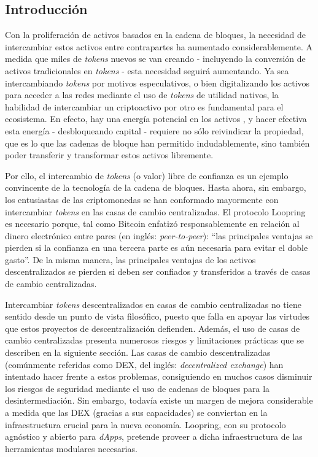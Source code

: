 \documentclass[UTF8,nofonts]{article}
\begin{document}
\begin{multicols}{2}
\section{Introducción\label{sec:introduction}}

Con la proliferación de activos basados en la cadena de bloques, la necesidad de intercambiar estos activos entre contrapartes ha aumentado considerablemente. A medida que miles de \textit{tokens} nuevos se van creando - incluyendo la conversión de activos tradicionales en \textit{tokens} - esta necesidad seguirá aumentando. Ya sea intercambiando \textit{tokens} por motivos especulativos, o bien digitalizando los activos para acceder a las redes mediante el uso de \textit{tokens} de utilidad nativos, la habilidad de intercambiar un criptoactivo por otro es fundamental para el ecosistema. En efecto, hay una energía potencial en los activos \cite{desotocapital}, y hacer efectiva esta energía - desbloqueando capital - requiere no sólo reivindicar la propiedad, que es lo que las cadenas de bloque han permitido indudablemente, sino también poder transferir y transformar estos activos libremente.
 
Por ello, el intercambio de \textit{tokens} (o valor) libre de confianza es un ejemplo convincente de la tecnología de la cadena de bloques. Hasta ahora, sin embargo, los entusiastas de las criptomonedas se han conformado mayormente con intercambiar \textit{tokens} en las casas de cambio centralizadas. El protocolo Loopring es necesario porque, tal como Bitcoin enfatizó responsablemente \cite{nakamoto2008bitcoin} en relación al dinero electrónico entre pares (en inglés: \textit{peer-to-peer}): \enquote{las principales ventajas se pierden si la confianza en una tercera parte es aún necesaria para evitar el doble gasto}. De la misma manera, las principales ventajas de los activos descentralizados se pierden si deben ser confiados y transferidos a través de casas de cambio centralizadas.

{\setlength{\parskip}{0cm}Intercambiar \textit{tokens} descentralizados en casas de cambio centralizadas no tiene sentido desde un punto de vista filosófico, puesto que falla en apoyar las virtudes que estos proyectos de descentralización defienden. Además, el uso de casas de cambio centralizadas presenta numerosos riesgos y limitaciones prácticas que se describen en la siguiente sección. Las casas de cambio descentralizadas (comúnmente referidas como DEX, del inglés: \textit{decentralized exchange}) \cite{schuh2015bitshares} \cite{bancor} \cite{kyber} han intentado hacer frente a estos problemas, consiguiendo en muchos casos disminuir los riesgos de seguridad mediante el uso de cadenas de bloques para la desintermediación. Sin embargo, todavía existe un margen de mejora considerable a medida que las DEX (gracias a sus capacidades) se conviertan en la infraestructura crucial para la nueva economía. Loopring, con su protocolo agnóstico y abierto para \textit{dApps}, pretende proveer a dicha infraestructura de las herramientas modulares necesarias.}




\end{multicols}
\end{document}
